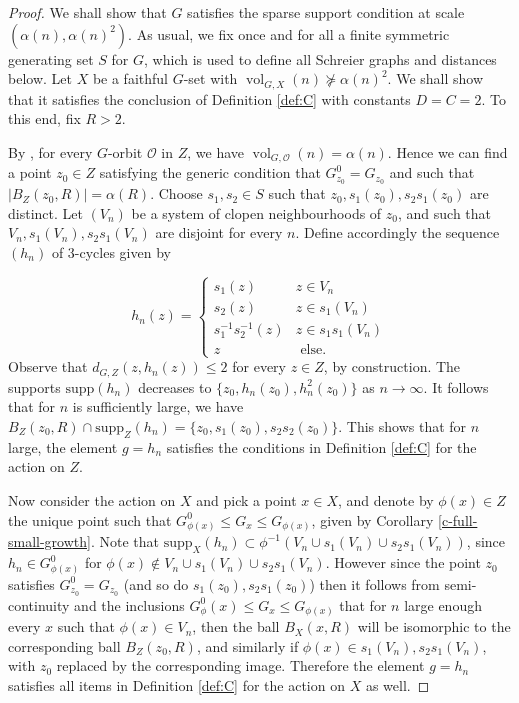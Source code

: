 \documentclass[11pt]{amsart}
\newcommand{\vol}{\ensuremath{\operatorname{vol}}}%
\newcommand{\supp}{\ensuremath{\textrm{supp}}}%
\theoremstyle{definition}
\theoremstyle{plain}
\theoremstyle{remark}
\begin{document}
\begin{proof}
We shall show that $G$ satisfies the sparse support condition at scale $(\alpha(n), \alpha(n)^2)$. As usual, we fix once and for all a finite symmetric generating set $S$ for $G$, which is used to define all Schreier graphs and distances below. Let $X$ be a faithful $G$-set with $\vol_{G, X}(n)\not \succcurlyeq \alpha(n)^2$. We shall show that it  satisfies the conclusion of Definition \ref{def:C} with constants $D=C=2$. To this end, fix $R>2$. 
 
 By \cite[Lemma 6.2]{LB-MB-comm-lemma}, for every $G$-orbit $\mathcal{O}$ in $Z$, we have $\vol_{G, \mathcal{O}}(n)=\alpha(n)$. Hence we can find a point $z_0\in Z$ satisfying the generic condition that $G^0_{z_0}=G_{z_0}$ and such that $|B_Z(z_0, R)|=\alpha(R)$.  Choose $s_1, s_2\in S$ such that $z_0, s_1(z_0),s_2s_1(z_0)$ are distinct. Let $(V_{n})$ be a system of clopen neighbourhoods of $z_0$, and such that $V_n, s_1(V_n), s_2s_1(V_n)$ are disjoint for every $n$. Define accordingly the sequence $(h_n)$ of 3-cycles given by 
 
 \[h_n(z)=\left\{ \begin{array}{lc} s_1(z) & z\in V_n\\ s_2(z) & z\in s_1(V_n) \\ s_1^{-1}s_2^{-1}(z) & z\in s_1s_1(V_n)\\ z & \text{ else.}
 
 \end{array}\right.
  \] 
  Observe that $d_{G, Z}(z, h_n(z))\le 2$ for every $z\in Z$,  by construction. 
  The supports $\supp(h_n)$  decreases to $\{z_0, h_n(z_0), h_n^2(z_0)\}$ as $n\to \infty$. It follows that for  $n$ is sufficiently large, we have $B_Z(z_0, R) \cap \supp_Z(h_n)= \{z_0, s_1(z_0), s_2s_2(z_0)\}$. 
  This shows that for $n$ large, the element $g=h_n$ satisfies the conditions in Definition \ref{def:C} for the action on $Z$. 
  
  Now consider the action on $X$ and pick a point $x\in X$, and denote by $\phi(x)\in Z$ the unique point such that $G^0_{\phi(x)}\le G_x \le G_{\phi(x)}$, given by Corollary \ref{c-full-small-growth}. Note that $\supp_X(h_n)\subset  \phi^{-1}(V_n\cup s_1(V_n)\cup s_2s_1(V_n))$, since $h_n\in G^0_{\phi(x)}$ for $\phi(x)\notin V_n\cup s_1(V_n)\cup s_2s_1(V_n)$. However since the point $z_0$ satisfies $G^0_{z_0}=G_{z_0}$ (and so do $s_1(z_0), s_2s_1(z_0)$) then it follows from semi-continuity  and the inclusions $G^0_\phi(x)\le G_x \le G_{\phi(x)}$ that for $n$ large enough every $x$ such that $\phi(x)\in  V_n$, then the ball $B_X(x, R)$ will be isomorphic to the corresponding ball  $B_Z( z_0, R)$, and similarly if $\phi(x)\in s_1(V_n), s_2s_1(V_n)$, with $z_0$ replaced by the corresponding image. Therefore the element $g=h_n$ satisfies all items in Definition \ref{def:C} for the action on $X$ as well. 
  \qedhere
 \end{proof}


















\end{document}

